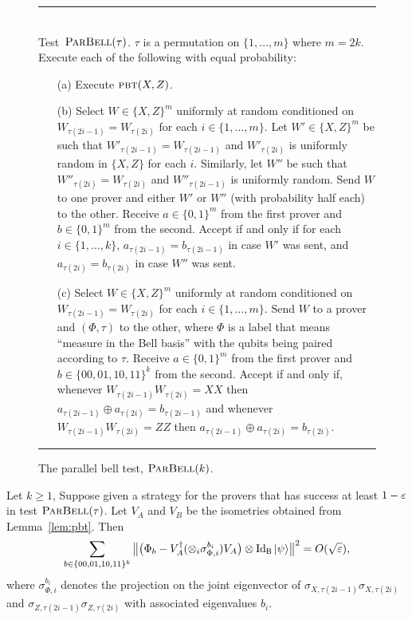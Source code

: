 \begin{figure}[H]
\rule[1ex]{\textwidth}{0.5pt}\\
\justifying
Test~$\textsc{ParBell}(\tau)$. $\tau$ is a permutation on $\{1,\ldots,m\}$ where  $m=2k$. \\
Execute each of the following with equal probability: 
\begin{enumerate}
\item[(a)] Execute $\textsc{pbt}(X,Z)$.
\item[(b)] Select $W\in \{X,Z\}^m$ uniformly at random conditioned on $W_{\tau(2i-1)}=W_{\tau(2i)}$ for each $i\in\{1,\ldots,m\}$. Let $W' \in \{X,Z\}^m$ be such that $W'_{\tau(2i-1)}=W_{\tau(2i-1)}$ and $W'_{\tau(2i)}$ is uniformly random in $\{X,Z\}$ for each $i$. Similarly, let $W''$ be such that $W''_{\tau(2i)}=W_{\tau(2i)}$ and $W''_{\tau(2i-1)}$ is uniformly random. Send $W$ to one prover and either $W'$ or $W''$ (with probability half each) to the other. Receive $a\in\{0,1\}^m$ from the first prover and $b\in\{0,1\}^m$ from the second. Accept if and only if for each $i\in\{1,\ldots,k\}$, $a_{\tau(2i-1)}=b_{\tau(2i-1)}$ in case $W'$ was sent, and $a_{\tau(2i)}=b_{\tau(2i)}$ in case $W''$ was sent.
\item[(c)] Select $W\in \{X,Z\}^m$ uniformly at random conditioned on $W_{\tau(2i-1)}=W_{\tau(2i)}$ for each $i\in\{1,\ldots,m\}$. Send $W$ to a prover and $(\Phi,\tau)$ to the other, where $\Phi$ is a label that means ``measure in the Bell basis'' with the qubits being paired according to $\tau$. Receive $a\in\{0,1\}^m$ from the first prover and $b\in\{00,01,10,11\}^k$ from the second. Accept if and only if, whenever $W_{\tau(2i-1)}W_{\tau(2i)}=XX$ then $a_{\tau(2i-1)}\oplus a_{\tau(2i)}=b_{\tau(2i-1)}$ and whenever $W_{\tau(2i-1)}W_{\tau(2i)}=ZZ$ then $a_{\tau(2i-1)}\oplus a_{\tau(2i)}=b_{\tau(2i)}$.
\end{enumerate}
\rule[2ex]{\textwidth}{0.5pt}\vspace{-.5cm}
\caption{The parallel bell test, $\textsc{ParBell}(k)$.}
\label{fig:pbell-test}
\end{figure}

\begin{lemma}\label{lem:perm-test}
Let $k\geq 1$, Suppose given a strategy for the provers that has success at least $1-\varepsilon$ in test $\textsc{ParBell}(\tau)$. Let $V_A$ and $V_B$ be the isometries obtained from Lemma~\ref{lem:pbt}. Then 
$$ \sum_{b\in\{00,01,10,11\}^k} \big\|\big(\Phi_b - V_A^\dagger (\otimes_i \sigma_{\Phi,i}^{b_i} ) V_A\big)\otimes \mathop{\rm Id}\nolimits_{{\textsf{B}}}|\psi\rangle \big\|^2 = O(\sqrt{\varepsilon}),$$
where $\sigma_{\Phi,i}^{b_i}$ denotes the projection on the joint eigenvector of $\sigma_{X,\tau(2i-1)}\sigma_{X,\tau(2i)}$ and $\sigma_{Z,\tau(2i-1)}\sigma_{Z,\tau(2i)}$ with associated eigenvalues $b_i$. 
\end{lemma}

